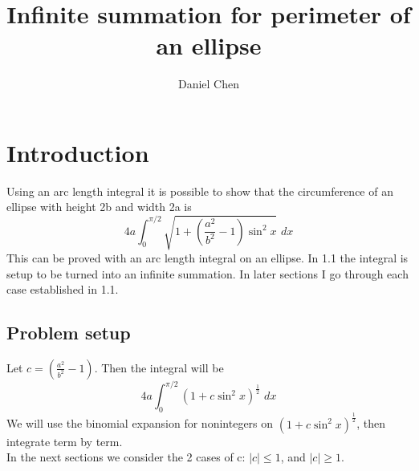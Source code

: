 \documentclass{article}
\begin{document}
\title{Infinite summation for perimeter of an ellipse}
\author{Daniel Chen}
\date{}

\maketitle

\tableofcontents
\newpage



\section{Introduction}
Using an arc length integral it is possible to show that the circumference of an ellipse with height 2b and width 2a is
\[4a\int_{0}^{\pi/2}\sqrt{1 + (\frac{a^2}{b^2}-1)\sin^2x}\,\,dx\]
This can be proved with an arc length integral on an ellipse. 
In 1.1 the integral is setup to be turned into an infinite summation. 
In later sections I go through each case established in 1.1.
\subsection{Problem setup}
Let $c = (\frac{a^2}{b^2}-1)$. Then the integral will be
\[4a\int_{0}^{\pi/2}(1 + c\sin^2x)^\frac{1}{2}\,\,dx\]
We will use the binomial expansion for nonintegers on $(1 + c\sin^2x)^\frac{1}{2}$, then integrate term by term.\\
In the next sections we consider the 2 cases of c: $|c| \leq 1$, and $|c| \geq 1$.
\end{document}
